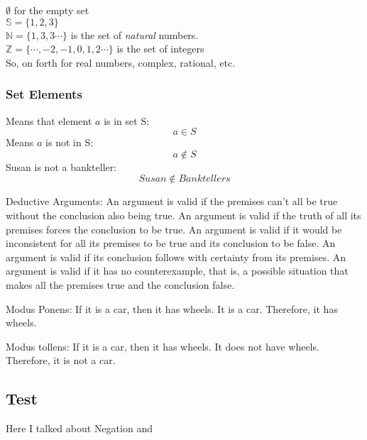 \documentclass[titlepage]{article}
\begin{document}
$ \emptyset $ for the empty set \\
$ \mathbb{S} = \{1, 2, 3\}$ \\ 
$ \mathbb{N} = \{ 1,3,3\cdots\}$  is the set of \textit{natural} numbers. \\
$ \mathbb{Z} = \{\cdots, -2, -1, 0, 1, 2 \cdots\} $ is the set of integers \\

So, on forth  for real numbers, complex, rational, etc.

\subsubsection{Set Elements}

Means that element $a$ is in set S: 
\begin{equation}
 a \in S 
\end{equation}
Means $a$ is not in S:
\begin{equation}
 a \notin S
\end{equation}
Susan is not a bankteller: 
\begin{equation}
 Susan \notin Banktellers 
\end{equation}

Deductive Arguments:
    An argument is valid if the premises can’t all be true without the conclusion also being true.
    An argument is valid if the truth of all its premises forces the conclusion to be true.
    An argument is valid if it would be inconsistent for all its premises to be true and its conclusion to be false.
    An argument is valid if its conclusion follows with certainty from its premises.
    An argument is valid if it has no counterexample, that is, a possible situation that makes all the premises true and the conclusion false.

Modus Ponens: If it is a car, then it has wheels. It is a car. Therefore, it has wheels. 

Modus tollens: If it is a car, then it has wheels. It does not have wheels. Therefore, it is not a car.


\subsection{Test}
Here I talked about \gls{Negation} and 
\printglossaries
\end{document}
